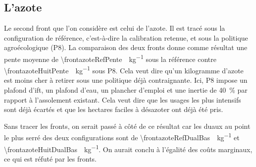 \begin{table}[h]
  \centering
  \caption{Front marge $\times$ enveloppe publique sous P4, en euros. L'astérisque marque les
  points de contrôle : l'objectif y retombe exactement sur le run non balayé
  (\num{\frontsubvQuatreTemoin}~M\eur), donc le plafond n'y contraint rien.}
  \label{tab:front-budget}
  \small
  
\end{table}

\subsection*{L'azote}

Le second front que l'on considère est celui de l'azote. Il est tracé sous la configuration de
référence, c'est-à-dire la calibration retenue, et sous la politique agroécologique (P8). La
comparaison des deux fronts donne comme résultat une pente moyenne de
\SI{\frontazoteRefPente}{\euros\per\kilogram} sous la référence contre
\SI{\frontazoteHuitPente}{\euros\per\kilogram} sous P8. Cela veut dire qu'un kilogramme d'azote
est moins cher à retirer sous une politique déjà contraignante. Ici, P8 impose un plafond
d'\gls{ift}, un plafond d'eau, un plancher d'emploi et une inertie de \SI{40}{\percent} par
rapport à l'assolement existant. Cela veut dire que les usages les plus intensifs sont déjà
écartés et que les hectares faciles à désazoter ont déjà été pris.

Sans tracer les fronts, on serait passé à côté de ce résultat car les duaux au point le plus
serré des deux configurations sont de \SI{\frontazoteRefDualBas}{\euros\per\kilogram} et
\SI{\frontazoteHuitDualBas}{\euros\per\kilogram}. On aurait conclu à l'égalité des coûts
marginaux, ce qui est réfuté par les fronts.
